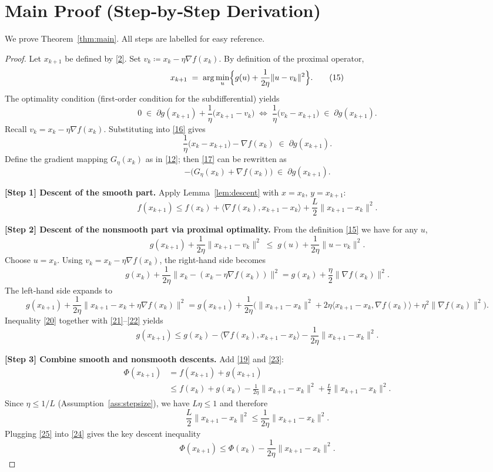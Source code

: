\documentclass{article}
\begin{document}
\section*{Main Proof (Step‑by‑Step Derivation)}
We prove Theorem~\ref{thm:main}. All steps are labelled for easy reference.

\begin{proof}
Let $x_{k+1}$ be defined by \eqref{2}. Set $v_k\coloneqq x_k-\eta\nabla f(x_k)$. By definition of the proximal operator,
\[
x_{k+1}\;=\;\arg\min_{u}\Bigl\{g(u)+\frac{1}{2\eta}\|u-v_k\|^{2}\Bigr\}.
\tag{15}
\]
The optimality condition (first‑order condition for the subdifferential) yields
\[
0\;\in\;\partial g(x_{k+1})+\frac{1}{\eta}\bigl(x_{k+1}-v_k\bigr)
\;\Longleftrightarrow\;
\frac{1}{\eta}\bigl(v_k-x_{k+1}\bigr)\;\in\;\partial g(x_{k+1}).
\tag{16}
\]
Recall $v_k=x_k-\eta\nabla f(x_k)$. Substituting into \eqref{16} gives
\[
\frac{1}{\eta}\bigl(x_k-x_{k+1}\bigr)-\nabla f(x_k)\;\in\;\partial g(x_{k+1}).
\tag{17}
\]
Define the gradient mapping $G_{\eta}(x_k)$ as in \eqref{12}; then \eqref{17} can be rewritten as
\[
-\bigl(G_{\eta}(x_k)+\nabla f(x_k)\bigr)\;\in\;\partial g(x_{k+1}).
\tag{18}
\]

\medskip
\noindent\textbf{[Step 1] Descent of the smooth part.}  
Apply Lemma~\ref{lem:descent} with $x=x_k$, $y=x_{k+1}$:
\[
f(x_{k+1})\le f(x_k)+\langle\nabla f(x_k),x_{k+1}-x_k\rangle+\frac{L}{2}\|x_{k+1}-x_k\|^{2}.
\tag{19}
\]

\noindent\textbf{[Step 2] Descent of the nonsmooth part via proximal optimality.}  
From the definition \eqref{15} we have for any $u$,
\[
g(x_{k+1})+\frac{1}{2\eta}\|x_{k+1}-v_k\|^{2}
\;\le\;
g(u)+\frac{1}{2\eta}\|u-v_k\|^{2}.
\tag{20}
\]
Choose $u=x_k$. Using $v_k=x_k-\eta\nabla f(x_k)$, the right‑hand side becomes
\[
g(x_k)+\frac{1}{2\eta}\|x_k-(x_k-\eta\nabla f(x_k))\|^{2}
= g(x_k)+\frac{\eta}{2}\|\nabla f(x_k)\|^{2}.
\tag{21}
\]
The left‑hand side expands to
\[
g(x_{k+1})+\frac{1}{2\eta}\|x_{k+1}-x_k+\eta\nabla f(x_k)\|^{2}
= g(x_{k+1})+\frac{1}{2\eta}\bigl(\|x_{k+1}-x_k\|^{2}
+2\eta\langle x_{k+1}-x_k,\nabla f(x_k)\rangle
+\eta^{2}\|\nabla f(x_k)\|^{2}\bigr).
\tag{22}
\]
Inequality \eqref{20} together with \eqref{21}–\eqref{22} yields
\[
g(x_{k+1})\le g(x_k)
-\langle\nabla f(x_k),x_{k+1}-x_k\rangle
-\frac{1}{2\eta}\|x_{k+1}-x_k\|^{2}.
\tag{23}
\]

\noindent\textbf{[Step 3] Combine smooth and nonsmooth descents.}  
Add \eqref{19} and \eqref{23}:
\[
\begin{aligned}
\Phi(x_{k+1})
&=f(x_{k+1})+g(x_{k+1})\\
&\le f(x_k)+g(x_k)
-\frac{1}{2\eta}\|x_{k+1}-x_k\|^{2}
+\frac{L}{2}\|x_{k+1}-x_k\|^{2}.
\end{aligned}
\tag{24}
\]
Since $\eta\le 1/L$ (Assumption~\ref{ass:stepsize}), we have $L\eta\le1$ and therefore
\[
\frac{L}{2}\|x_{k+1}-x_k\|^{2}
\le\frac{1}{2\eta}\|x_{k+1}-x_k\|^{2}.
\tag{25}
\]
Plugging \eqref{25} into \eqref{24} gives the key descent inequality
\[
\Phi(x_{k+1})\le\Phi(x_k)-\frac{1}{2\eta}\|x_{k+1}-x_k\|^{2}.
\tag{26}
\]


\end{proof}
\end{document}
